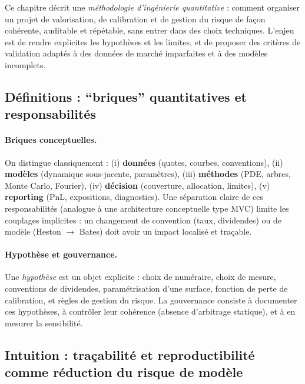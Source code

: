 \documentclass[11pt,a4paper]{article}
\newcommand{\1}{\mathbf{1}}
\begin{document}
Ce chapitre d\'ecrit une \emph{m\'ethodologie d'ing\'enierie quantitative} : comment organiser un projet de valorisation,
de calibration et de gestion du risque de fa\c{c}on coh\'erente, audit\-able et r\'ep\'etable, sans entrer dans des choix
techniques. L'enjeu est de rendre explicites les hypoth\`eses et les limites, et de proposer des crit\`eres de validation
adapt\'es \`a des donn\'ees de march\'e imparfaites et \`a des mod\`eles incomplets.

\subsection{D\'efinitions : ``briques'' quantitatives et responsabilit\'es}

\paragraph{Briques conceptuelles.}
On distingue classiquement : (i) \textbf{donn\'ees} (quotes, courbes, conventions), (ii) \textbf{mod\`eles} (dynamique sous-jacente, param\`etres),
(iii) \textbf{m\'ethodes} (PDE, arbres, Monte Carlo, Fourier), (iv) \textbf{d\'ecision} (couverture, allocation, limites), (v) \textbf{reporting}
(PnL, expositions, diagnostics). Une s\'eparation claire de ces responsabilit\'es (analogue \`a une architecture conceptuelle type MVC)
limite les couplages implicites : un changement de convention (taux, dividendes) ou de mod\`ele (Heston $\rightarrow$ Bates) doit avoir un impact
localis\'e et tra\c{c}able.

\paragraph{Hypoth\`ese et gouvernance.}
Une \emph{hypoth\`ese} est un objet explicite : choix de num\'eraire, choix de mesure, conventions de dividendes, param\'etrisation d'une surface,
fonction de perte de calibration, et r\`egles de gestion du risque. La gouvernance consiste \`a documenter ces hypoth\`eses, \`a contr\^oler leur
coh\'erence (absence d'arbitrage statique), et \`a en mesurer la sensibilit\'e.

\subsection{Intuition : tra\c{c}abilit\'e et reproductibilit\'e comme r\'eduction du risque de mod\`ele}
\end{document}
